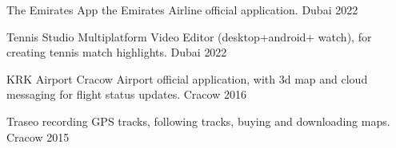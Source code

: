 

\begin{cvhonors2}

\cvhonor
    {The Emirates App} %
    {the Emirates Airline official application.} %
    {Dubai} %
    {2022} %

\cvhonor
    {Tennis Studio} %
    {Multiplatform Video Editor (desktop+android+ watch), for creating tennis match highlights.} %
    {Dubai} %
    {2022} %


  \cvhonor
    {KRK Airport} %
    {Cracow Airport official application, with 3d map and cloud messaging for flight status updates.} %
    {Cracow} %
    {2016} %

  \cvhonor
    {Traseo} %
    {recording GPS tracks, following tracks, buying and downloading maps.} %
    {Cracow} %
    {2015} %

 
\end{cvhonors2}
